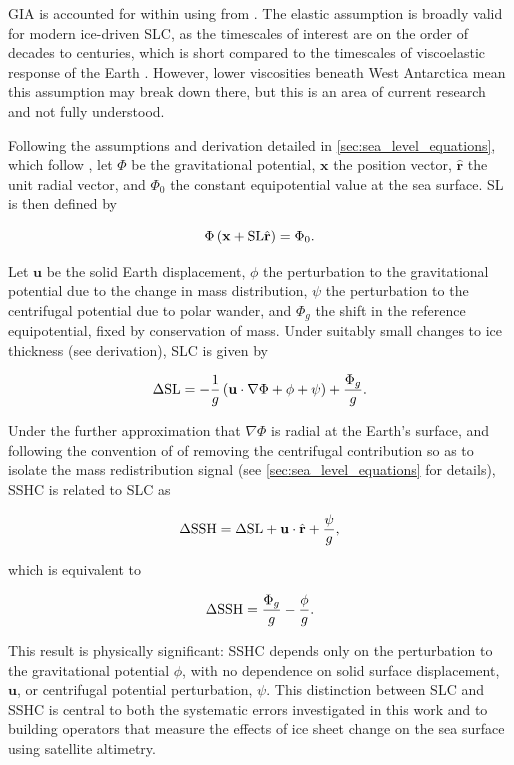 GIA is accounted for within  using  \autocite{royICE7G2018} from \textcite{royGlacialIsostaticAdjustment2015}. The elastic assumption is broadly valid for modern ice-driven SLC, as the timescales of interest are on the order of decades to centuries, which is short compared to the timescales of viscoelastic response of the Earth \autocite{al-attarReciprocitySensitivityKernels2023, coulsonDetectionSeaLevel2022, zwallyMassBalanceAntarctic2021}. However, lower viscosities beneath West Antarctica \autocite{kaufmannLateralViscosityVariations2005} mean this assumption may break down there, but this is an area of current research and not fully understood.

Following the assumptions and derivation detailed in \autoref{sec:sea_level_equations}, which follow \textcite{al-attarReciprocitySensitivityKernels2023}, let $\Phi$ be the gravitational potential, $\mathbf{x}$ the position vector, $\hat{\mathbf{r}}$ the unit radial vector, and $\Phi_0$ the constant equipotential value at the sea surface. SL is then defined by

\begin{equation}
    \Phi\left(\mathbf{x}+\mathrm{SL}\hat{\mathbf{r}}\right) = \Phi_0.
\end{equation}

Let $\mathbf{u}$ be the solid Earth displacement, $\phi$ the perturbation to the gravitational potential due to the change in mass distribution, $\psi$ the perturbation to the centrifugal potential due to polar wander, and $\Phi_g$ the shift in the reference equipotential, fixed by conservation of mass. Under suitably small changes to ice thickness (see derivation), SLC is given by

\begin{equation}
  \Delta \mathrm{SL} = -\frac{1}{g}\left(\mathbf{u} \cdot \nabla\Phi + \phi + \psi\right)
  + \frac{\Phi_g}{g}.
\end{equation}

Under the further approximation that $\nabla\Phi$ is radial at the Earth's surface, and following the convention of \textcite{al-attarReciprocitySensitivityKernels2023} of removing the centrifugal contribution so as to isolate the mass redistribution signal (see \autoref{sec:sea_level_equations} for details), SSHC is related to SLC as

\begin{equation}
  \Delta \mathrm{SSH} = \Delta \mathrm{SL} + \mathbf{u} \cdot \hat{\mathbf{r}} + \frac{\psi}{g},
\end{equation}

which is equivalent to

\begin{equation}
  \Delta \mathrm{SSH} = \frac{\Phi_g}{g} - \frac{\phi}{g}.
\end{equation}

This result is physically significant: SSHC depends only on the perturbation to the gravitational potential $\phi$, with no dependence on solid surface displacement, $\mathbf{u}$, or centrifugal potential perturbation, $\psi$. This distinction between SLC and SSHC is central to both the systematic errors investigated in this work and to building operators that measure the effects of ice sheet change on the sea surface using satellite altimetry.

